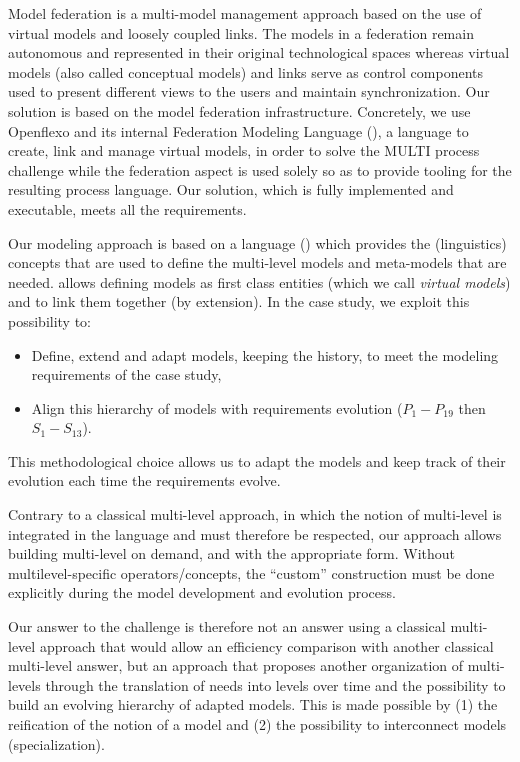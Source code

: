 Model federation is a multi-model management approach based on the use of virtual models and loosely coupled links. The models in a federation remain autonomous and represented in their original technological spaces whereas virtual models (also called conceptual models) and links serve as control components used to present different views to the users and maintain synchronization.
Our solution is based on the model federation infrastructure. Concretely, we use Openflexo and its internal Federation Modeling Language (\FML), a language to create, link and manage virtual models, in order to solve the MULTI process challenge while the federation aspect is used solely so as to provide tooling for the resulting process language. Our solution, which is fully implemented and executable, meets all the requirements.

Our modeling approach is based on a language (\FML) which provides the (linguistics) concepts that are used to define the multi-level models and meta-models that are needed. \FML allows defining models as first class entities (which we call \emph{virtual models}) and to link them together (by extension). In the \mpc case study, we exploit this possibility to:
\begin{itemize}
    \item Define, extend and adapt models, keeping the history, to meet the %
    modeling requirements of the case study,
    \item Align this hierarchy of models with requirements evolution ($P_1-P_{19}$ then $S_1-S_{13}$).
\end{itemize}
This methodological choice allows us to adapt the models and keep track of their evolution each time the requirements evolve.

Contrary to a classical multi-level approach, in which the notion of
multi-level is integrated in the language and must therefore be respected, our
approach allows building multi-level on demand, and with the appropriate form.
Without multilevel-specific operators/concepts, the \enquote{custom}
construction must be done explicitly during the model development and evolution
process.

Our answer to the challenge is therefore not an answer using a classical multi-level approach that would allow an efficiency comparison with another classical multi-level answer, but an approach that proposes another organization of multi-levels through the translation of needs into levels over time and the possibility to build an evolving hierarchy of adapted models. This is made possible by (1) the reification of the notion of a model and (2) the possibility to interconnect models (specialization).%

